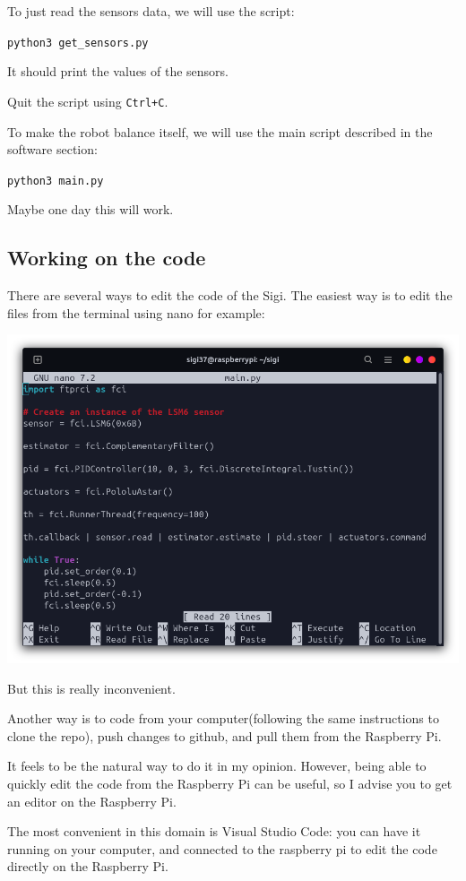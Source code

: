 \documentclass{article}
\begin{document}
To just read the sensors data, we will use the script:

\texttt{python3 get\_sensors.py}

It should print the values of the sensors.

Quit the script using \texttt{Ctrl+C}.

To make the robot balance itself, we will use the main script described in the software section:

\texttt{python3 main.py}

Maybe one day this will work.

\subsection{Working on the code}

There are several ways to edit the code of the Sigi. The easiest way is to edit the files from the
terminal using nano for example:

\includegraphics[scale=0.37]{img/nano_main.png}

But this is really inconvenient.

Another way is to code from your computer(following the same instructions to clone the repo), push
changes to github, and pull them from the Raspberry Pi.

It feels to be the natural way to do it in my opinion. However, being able to quickly edit the
code from the Raspberry Pi can be useful, so I advise you to get an editor on the Raspberry Pi.

The most convenient in this domain is Visual Studio Code: you can have it running on your computer,
and connected to the raspberry pi to edit the code directly on the Raspberry Pi.
\end{document}
